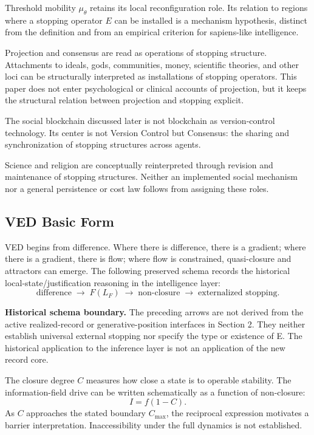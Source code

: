 Threshold mobility $\mu_\theta$ retains its local reconfiguration role. Its relation to regions where a stopping operator $E$ can be installed is a mechanism hypothesis, distinct from the definition and from an empirical criterion for sapiens-like intelligence.

Projection and consensus are read as operations of stopping structure. Attachments to ideals, gods, communities, money, scientific theories, and other loci can be structurally interpreted as installations of stopping operators. This paper does not enter psychological or clinical accounts of projection, but it keeps the structural relation between projection and stopping explicit.

The social blockchain discussed later is not blockchain as version-control technology. Its center is not Version Control but Consensus: the sharing and synchronization of stopping structures across agents.

Science and religion are conceptually reinterpreted through revision and maintenance of stopping structures. Neither an implemented social mechanism nor a general persistence or cost law follows from assigning these roles.

\subsection{VED Basic Form}

VED begins from difference. Where there is difference, there is a gradient; where there is a gradient, there is flow; where flow is constrained, quasi-closure and attractors can emerge. The following preserved schema records the historical local-state/justification reasoning in the intelligence layer:
\[
\text{difference} \;\longrightarrow\; F(L_F) \;\longrightarrow\; \text{non-closure} \;\longrightarrow\; \text{externalized stopping}.
\]

\noindent\textbf{Historical schema boundary.} The preceding arrows are not derived from the active realized-record or generative-position interfaces in Section 2. They neither establish universal external stopping nor specify the type or existence of E. The historical application to the inference layer is not an application of the new record core.

The closure degree $C$ measures how close a state is to operable stability. The information-field drive can be written schematically as a function of non-closure:
\[
I = f(1-C).
\]
As $C$ approaches the stated boundary $C_{\max}$, the reciprocal expression motivates a barrier interpretation. Inaccessibility under the full dynamics is not established.

